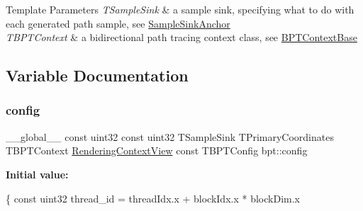 \begin{DoxyTemplParams}{Template Parameters}
{\em T\+Sample\+Sink} & a sample sink, specifying what to do with each generated path sample, see \hyperlink{struct_sample_sink_base_SampleSinkAnchor}{Sample\+Sink\+Anchor} \\
\hline
{\em T\+B\+P\+T\+Context} & a bidirectional path tracing context class, see \hyperlink{struct_b_p_t_context_base}{B\+P\+T\+Context\+Base} \\
\hline
\end{DoxyTemplParams}


\subsection{Variable Documentation}
\mbox{\label{group___b_p_t_lib_ga4acc93dc19749d0de9da560b4347dec3}} 
\subsubsection{\texorpdfstring{config}{config}}
{\footnotesize\ttfamily \+\_\+\+\_\+global\+\_\+\+\_\+ const uint32 const uint32 T\+Sample\+Sink T\+Primary\+Coordinates T\+B\+P\+T\+Context \hyperlink{struct_rendering_context_view}{Rendering\+Context\+View} const T\+B\+P\+T\+Config bpt\+::config}

{\bfseries Initial value\+:}
\begin{DoxyCode}
\{
    \textcolor{keyword}{const} uint32 thread\_id = threadIdx.x + blockIdx.x * blockDim.x
\end{DoxyCode}
